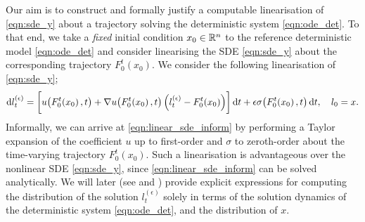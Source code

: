 Our aim is to construct and formally justify a computable linearisation of \eqref{eqn:sde_y} about a trajectory solving the deterministic system \eqref{eqn:ode_det}.
To that end, we take a \emph{fixed} initial condition \(x_0 \in \mathbb{R}^n\) to the reference deterministic model \eqref{eqn:ode_det} and consider linearising the SDE \eqref{eqn:sde_y} about the corresponding trajectory \(F_0^t\!\left(x_0\right)\).
We consider the following linearisation of \eqref{eqn:sde_y};
\begin{equation}
	\dif l_t^{(\epsilon)} = \left[u\!\left(F_0^t\!\left(x_0\right), t\right) + \nabla u\!\left(F_0^t\!\left(x_0\right), t\right)\left(l_t^{(\epsilon)} - F_0^t\!\left(x_0\right)\right)\right]\dif t + \epsilon\sigma\!\left(F_0^t\!\left(x_0\right), t\right)\dif t, \quad l_0 = x.
	\label{eqn:linear_sde_inform}
\end{equation}
Informally, we can arrive at \eqref{eqn:linear_sde_inform} by performing a Taylor expansion of the coefficient \(u\) up to first-order and \(\sigma\) to zeroth-order about the time-varying trajectory \(F_0^t\!\left(x_0\right)\).
Such a linearisation is advantageous over the nonlinear SDE \eqref{eqn:sde_y}, since \eqref{eqn:linear_sde_inform} can be solved analytically.
We will later (see  and ) provide explicit expressions for computing the distribution of the solution \(l_t^{(\epsilon)}\) solely in terms of the solution dynamics of the deterministic system \eqref{eqn:ode_det}, and the distribution of \(x\).

